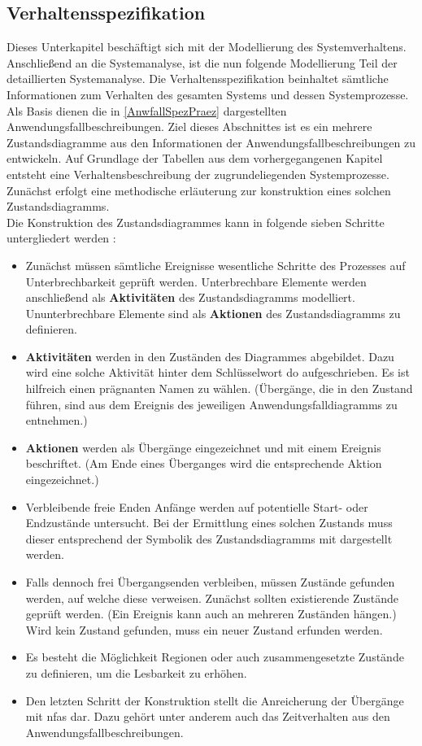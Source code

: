 \documentclass[../../../Bachelorarbeit.tex]{subfiles}
\begin{document}
\subsection{Verhaltensspezifikation}
Dieses Unterkapitel beschäftigt sich mit der Modellierung des Systemverhaltens. Anschließend an die Systemanalyse, ist die nun folgende Modellierung Teil der detaillierten Systemanalyse. Die Verhaltensspezifikation beinhaltet sämtliche Informationen zum Verhalten des gesamten Systems und dessen Systemprozesse. Als Basis dienen die in \autoref{AnwfallSpezPraez} dargestellten Anwendungsfallbeschreibungen. Ziel dieses Abschnittes ist es ein \bzw mehrere Zustandsdiagramme aus den Informationen der Anwendungsfallbeschreibungen zu entwickeln. Auf Grundlage der Tabellen aus dem vorhergegangenen Kapitel entsteht eine Verhaltensbeschreibung der zugrundeliegenden Systemprozesse. Zunächst erfolgt eine methodische erläuterung zur konstruktion eines solchen Zustandsdiagramms. \\
Die Konstruktion des Zustandsdiagrammes kann in folgende sieben Schritte untergliedert werden \cite[438]{Goll2011}:
\begin{itemize}
    \item Zunächst müssen sämtliche Ereignisse \bzw wesentliche Schritte des Prozesses auf Unterbrechbarkeit geprüft werden. Unterbrechbare Elemente werden anschließend als \textbf{Aktivitäten} des Zustandsdiagramms modelliert. Ununterbrechbare Elemente sind als \textbf{Aktionen} des Zustandsdiagramms zu definieren.
    \item \textbf{Aktivitäten} werden in den Zuständen des Diagrammes abgebildet. Dazu wird eine solche Aktivität hinter dem Schlüsselwort \glqq do\grqq{} aufgeschrieben. Es ist hilfreich einen prägnanten Namen zu wählen. (Übergänge, die in den Zustand führen, sind aus dem Ereignis des jeweiligen Anwendungsfalldiagramms zu entnehmen.)
    \item \textbf{Aktionen} werden als Übergänge eingezeichnet und mit einem Ereignis beschriftet. (Am Ende eines Überganges wird die entsprechende Aktion eingezeichnet.)
    \item Verbleibende freie Enden \bzw Anfänge werden auf potentielle Start- oder Endzustände untersucht. Bei der Ermittlung eines solchen Zustands muss dieser entsprechend der Symbolik des Zustandsdiagramms mit dargestellt werden.
    \item Falls dennoch frei Übergangsenden verbleiben, müssen Zustände gefunden werden, auf welche diese verweisen. Zunächst sollten existierende Zustände geprüft werden. (Ein Ereignis kann auch an mehreren Zuständen hängen.) Wird kein Zustand gefunden, muss ein neuer Zustand erfunden werden.
    \item Es besteht die Möglichkeit Regionen oder auch zusammengesetzte Zustände zu definieren, um die Lesbarkeit zu erhöhen.
    \item Den letzten Schritt der Konstruktion stellt die Anreicherung der Übergänge mit \acp{nfa} dar. Dazu gehört unter anderem auch das Zeitverhalten aus den Anwendungsfallbeschreibungen. 
\end{itemize}
\end{document}

